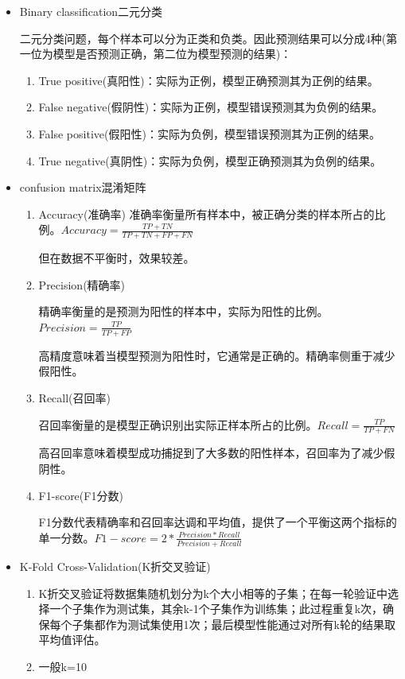 \documentclass[UTF8]{ctexart}
\begin{document}
\begin{itemize}
    \item Binary classification二元分类 
    
    二元分类问题，每个样本可以分为正类和负类。因此预测结果可以分成4种(第一位为模型是否预测正确，第二位为模型预测的结果)：
    \begin{enumerate}
        \item True positive(真阳性)：实际为正例，模型正确预测其为正例的结果。
        \item False negative(假阴性)：实际为正例，模型错误预测其为负例的结果。
        \item False positive(假阳性)：实际为负例，模型错误预测其为正例的结果。
        \item True negative(真阴性)：实际为负例，模型正确预测其为负例的结果。
    \end{enumerate}
    \item confusion matrix混淆矩阵
    \begin{enumerate}
        \item Accuracy(准确率) 
        准确率衡量所有样本中，被正确分类的样本所占的比例。$Accuracy=\frac{TP+TN}{TP+TN+FP+FN}$

        但在数据不平衡时，效果较差。

        \item Precision(精确率)
        
        精确率衡量的是预测为阳性的样本中，实际为阳性的比例。$Precision=\frac{TP}{TP+FP}$

        高精度意味着当模型预测为阳性时，它通常是正确的。精确率侧重于减少假阳性。
        \item Recall(召回率)
        
        召回率衡量的是模型正确识别出实际正样本所占的比例。$Recall=\frac{TP}{TP+FN}$

        高召回率意味着模型成功捕捉到了大多数的阳性样本，召回率为了减少假阴性。

        \item F1-score(F1分数)
        
        F1分数代表精确率和召回率达调和平均值，提供了一个平衡这两个指标的单一分数。$F1-score=2*\frac{Precision*Recall}{Precision+Recall}$
    \end{enumerate}

    \item K-Fold Cross-Validation(K折交叉验证)
    \begin{enumerate}
        \item K折交叉验证将数据集随机划分为k个大小相等的子集；在每一轮验证中选择一个子集作为测试集，其余k-1个子集作为训练集；此过程重复k次，确保每个子集都作为测试集使用1次；最后模型性能通过对所有k轮的结果取平均值评估。
        \item 一般k=10
    \end{enumerate}


\end{itemize}
\end{document}
